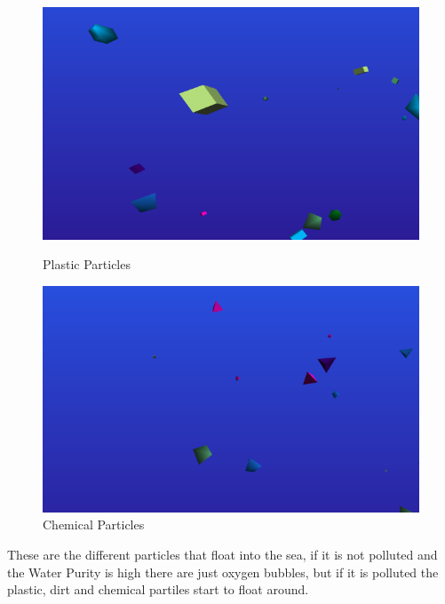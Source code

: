\documentclass[a4paper,10pt]{article}
\begin{document}
\begin{figure}[H]
    \centering
    \begin{minipage}{0.45\textwidth}
        \centering
        \includegraphics[width=1\textwidth]{Screenshot_20190226_200345.png} %
        \caption{Plastic Particles}
    \end{minipage}\hfill
    \begin{minipage}{0.45\textwidth}
        \centering
        \includegraphics[width=1\textwidth]{Screenshot_20190226_200422.png} %
        \caption{Chemical Particles}
    \end{minipage}
\end{figure}


These are the different particles that float into the sea, if it is not polluted and the Water Purity is high there are just oxygen bubbles, but if it is polluted the plastic, dirt and chemical partiles start to float around.
\end{document}
